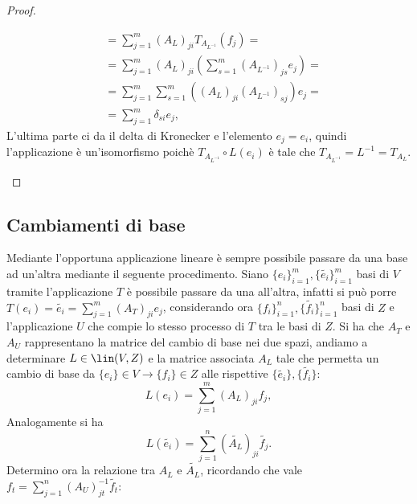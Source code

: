 \begin{proof}
\begin{itemize}
\begin{equation*}
\begin{split}
				&= \sum_{j=1}^m(A_{L})_{ji} T_{A_{L^{-1}}}(f_{j}) =\\ 
				&= \sum_{j=1}^m(A_{L})_{ji}( \sum_{s=1}^m(A_{L^{-1}})_{js} e_{j}) =\\ 
				&= \sum_{j=1}^m \sum_{s=1}^m((A_{L})_{ji} (A_{L^{-1}})_{sj}) e_{j} =\\
				&=  \sum_{j=1}^m\delta_{si} e_j,
			\end{split}
		\end{equation*}
		L'ultima parte ci da il delta di Kronecker e l'elemento $e_j = e_i$, quindi l'applicazione è un'isomorfismo poichè $T_{A_{L^{-1}}}\circ L (e_i)$ è tale che $T_{A_{L^{-1}}} = L^{-1} = T_{A_L}$.
	\end{itemize}
\end{proof}

\subsection{Cambiamenti di base}
Mediante l'opportuna applicazione lineare è sempre possibile passare da una base ad un'altra mediante il seguente procedimento.
Siano $\{e_i\}_{i=1}^m,\{\tilde{e_i}\}_{i=1}^m$ basi di $V$ tramite l'applicazione $T$ è possibile passare da una all'altra, infatti si può porre $T(e_i) = \tilde{e_i} =  \sum_{j=1}^m(A_T)_{ji}e_j$, considerando ora  $\{f_i\}_{i=1}^n,\{\tilde{f_i}\}_{i=1}^n$ basi di $Z$ e l'applicazione $U$ che compie lo stesso processo di $T$ tra le basi di $Z$.
Si ha che $A_T$ e $A_U$ rappresentano la matrice del cambio di base nei due spazi, andiamo a determinare $L\in \lin(V,Z)$ e la matrice associata $A_L$ tale che permetta un cambio di base da $\{e_i\}\in V\to\{f_i\}\in Z$ alle rispettive $\{\tilde{e_i}\},\{\tilde{f_i}\}$:
\begin{equation*}
	L(e_i) = \sum_{j=1}^m(A_L)_{ji}f_j,
\end{equation*}
Analogamente si ha
\begin{equation*}
	L(\tilde{e_i}) = \sum_{j=1}^n(\tilde{A_L})_{ji}\tilde{f_j}.
\end{equation*}
Determino ora la relazione tra $A_L$ e $\tilde{A_L}$, ricordando che vale $f_t = \sum_{j=1}^n(A_U)_{jt}^{-1}\tilde{f_t}$:
